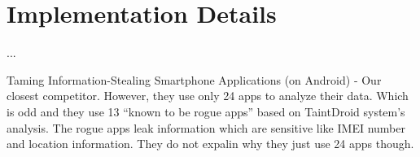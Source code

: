 \section{Implementation Details}
...

Taming Information-Stealing Smartphone Applications (on Android) - Our closest competitor. However, they use only 24 apps to analyze their data. Which is odd and they use 13 ``known to be rogue apps'' based on TaintDroid system's analysis. The rogue apps leak information which are sensitive like IMEI number and location information. They do not expalin why they just use 24 apps though.